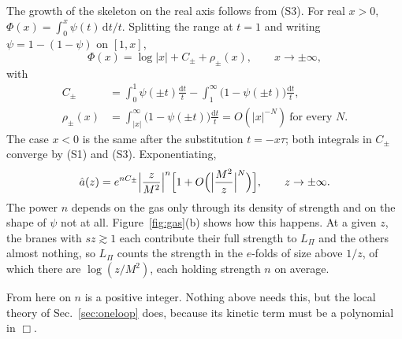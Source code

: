 \documentclass[a4paper,11pt]{article}
\newcommand{\dd}{\mathrm{d}}
\begin{document}
The growth of the skeleton on the real axis follows from (S3). For real $x>0$, $\Phi(x)=\int_0^x\psi(t)\,\dd t/t$. Splitting the range at $t=1$ and writing $\psi=1-(1-\psi)$ on $[1,x]$,
\begin{equation}
\label{eq:Phi-asym}
\Phi(x)=\log|x|+C_\pm+\rho_\pm(x),\qquad x\to\pm\infty,
\end{equation}
with
\begin{align*}
C_\pm&=\int_0^1\psi(\pm t)\frac{\dd t}t-\int_1^\infty\bigl(1-\psi(\pm t)\bigr)\frac{\dd t}t,\\
\rho_\pm(x)&=\int_{|x|}^\infty\bigl(1-\psi(\pm t)\bigr)\frac{\dd t}t=O(|x|^{-N})\ \text{for every }N.
\end{align*}
The case $x<0$ is the same after the substitution $t=-x\tau$; both integrals in $C_\pm$ converge by (S1) and (S3). Exponentiating,
\begin{equation}
\label{eq:a-asym}
\hat a(z)=e^{nC_\pm}\Bigl|\frac z{M^2}\Bigr|^{n}\Bigl[1+O\Bigl(\Bigl|\frac{M^2}{z}\Bigr|^{N}\Bigr)\Bigr],\qquad z\to\pm\infty .
\end{equation}
The power $n$ depends on the gas only through its density of strength and on the shape of $\psi$ not at all. Figure~\ref{fig:gas}(b) shows how this happens. At a given $z$, the branes with $sz\gtrsim1$ each contribute their full strength to $L_\Pi$ and the others almost nothing, so $L_\Pi$ counts the strength in the $e$-folds of size above $1/z$, of which there are $\log(z/M^2)$, each holding strength $n$ on average.

From here on $n$ is a positive integer. Nothing above needs this, but the local theory of Sec.~\ref{sec:oneloop} does, because its kinetic term must be a polynomial in $\Box$.
\end{document}
